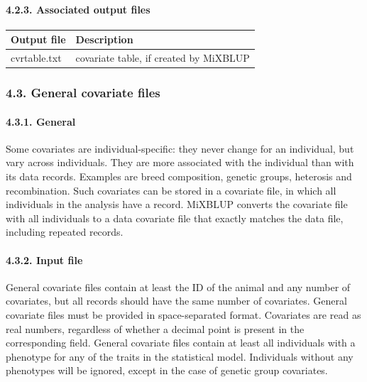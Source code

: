 \paragraph{4.2.3. Associated output files}\label{Obse15}

{\def\LTcaptype{none} %
\begin{longtable}[]{@{}ll@{}}
\toprule\noalign{}
Output file & Description \\
\midrule\noalign{}
\endhead
\bottomrule\noalign{}
\endlastfoot
cvrtable.txt & covariate table, if created by MiXBLUP \\
\end{longtable}
}

\subsubsection{4.3. General covariate files}\label{Obse16}

\paragraph{4.3.1. General}\label{Obse17}

Some covariates are individual-specific: they never change for an
individual, but vary across individuals. They are more associated with
the individual than with its data records. Examples are breed
composition, genetic groups, heterosis and recombination. Such
covariates can be stored in a covariate file, in which all individuals
in the analysis have a record. MiXBLUP converts the covariate file with
all individuals to a data covariate file that exactly matches the data
file, including repeated records.

\paragraph{4.3.2. Input file}\label{Obse18}

General covariate files contain at least the ID of the animal and any
number of covariates, but all records should have the same number of
covariates. General covariate files must be provided in space-separated
format. Covariates are read as real numbers, regardless of whether a
decimal point is present in the corresponding field. General covariate
files contain at least all individuals with a phenotype for any of the
traits in the statistical model. Individuals without any phenotypes will
be ignored, except in the case of genetic group covariates.

